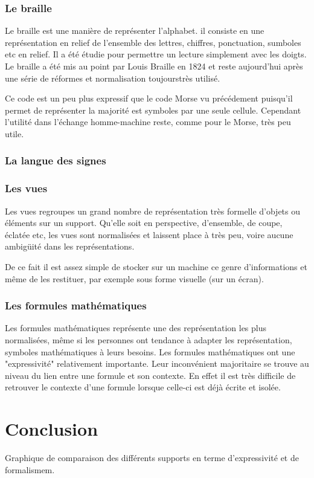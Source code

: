 \documentclass[french,a4paper]{article}
\begin{document}
\subsubsection{Le braille}
Le braille est une manière de représenter l'alphabet. il consiste en une représentation en relief de l'ensemble des lettres, chiffres, ponctuation, sumboles etc
en relief. Il a été étudie pour permettre un lecture simplement avec les doigts. Le braille a été mis au point par Louis Braille en 1824 et 
reste aujourd'hui après une série de réformes et normalisation toujourstrès utilisé.

Ce code est un peu plus expressif que le code Morse vu précédement puisqu'il permet de représenter la majorité est symboles par
une seule cellule. Cependant l'utilité dans l'échange homme-machine reste, comme pour le Morse, très peu utile.

\subsubsection{La langue des signes}

\subsubsection{Les vues}
Les vues regroupes un grand nombre de représentation très formelle d'objets ou éléments sur un support. Qu'elle soit
en perspective, d'ensemble, de coupe, éclatée etc, les vues sont normalisées et laissent place à très peu, voire aucune ambigüité dans les
représentations.

De ce fait il est assez simple de stocker sur un machine ce genre d'informations et même de les restituer, par exemple sous
forme visuelle (sur un écran).

\subsubsection{Les formules mathématiques}
Les formules mathématiques représente une des représentation les plus normalisées, même si les personnes ont tendance à 
adapter les représentation, symboles mathématiques à leurs besoins.
Les formules mathématiques ont une "expressivité" relativement importante. Leur inconvénient majoritaire se trouve au niveau 
du lien entre une formule et son contexte.
En effet il est très difficile de retrouver le contexte d'une formule lorsque celle-ci est déjà écrite et isolée.


\section{Conclusion}
Graphique de comparaison des différents supports en terme d'expressivité et de formalismem.
\end{document}
